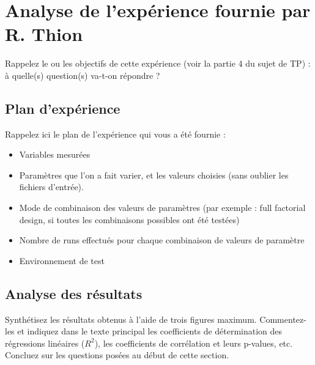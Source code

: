 
\section{Analyse de l'expérience fournie par R. Thion}

Rappelez le ou les objectifs de cette expérience (voir la partie 4 du sujet de TP) : à quelle(s) question(s) va-t-on répondre ?

\subsection{Plan d'expérience}
Rappelez ici le plan de l'expérience qui vous a été fournie :
\begin{itemize}
	\item Variables mesurées
	\item Paramètres que l'on a fait varier, et les valeurs choisies (sans oublier les fichiers d'entrée).
	\item Mode de combinaison des valeurs de paramètres (par exemple : full factorial design, si toutes les combinaisons possibles ont été testées)
	\item Nombre de runs effectués pour chaque combinaison de valeurs de paramètre
	\item Environnement de test
\end{itemize}

\subsection{Analyse des résultats}
Synthétisez les résultats obtenus à l'aide de trois figures maximum. Commentez-les et indiquez dans le texte principal les coefficients de détermination des régressions linéaires ($R^2$), les coefficients de corrélation et leurs p-values, etc.  Concluez sur les questions posées au début de cette section.

